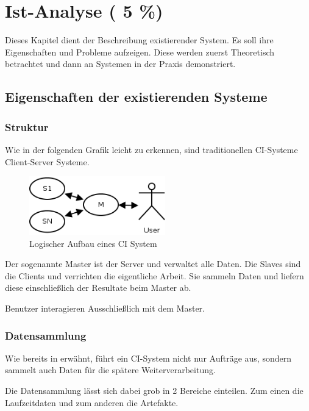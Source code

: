 \chapter{Ist-Analyse ( 5 \%)}
\label{chap:ist-analyse}

Dieses Kapitel dient der Beschreibung existierender System.
Es soll ihre Eigenschaften und Probleme aufzeigen.
Diese werden zuerst Theoretisch betrachtet und
dann an Systemen in der Praxis demonstriert.


\section{Eigenschaften der existierenden Systeme}

\subsection{Struktur}
\label{sec:ist-analyse:struktur}

Wie in der folgenden Grafik leicht zu erkennen,
sind traditionellen CI-Systeme Client-Server Systeme.

\begin{figure}[ht]
  \centering
  \label{fig:ist-aufbau-tradition}
  \includegraphics[height=1in]{imageinput/ist-aufbau-tradition.png}
  \caption{Logischer Aufbau eines CI System}
\end{figure}

Der sogenannte Master ist der Server und verwaltet alle Daten.
Die Slaves sind die Clients und verrichten die eigentliche Arbeit.
Sie sammeln Daten und liefern diese einschließlich der Resultate beim Master ab.

Benutzer interagieren Ausschließlich mit dem Master.

\subsection{Datensammlung}
Wie bereits in  erwähnt,
führt ein CI-System nicht nur Aufträge aus,
sondern sammelt auch Daten für die spätere Weiterverarbeitung.

Die Datensammlung lässt sich dabei grob in 2 Bereiche einteilen.
Zum einen die Laufzeitdaten und zum anderen die Artefakte.

